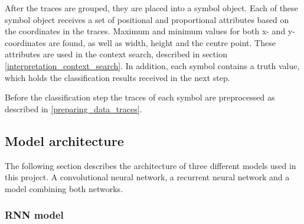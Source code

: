 After the traces are grouped, they are placed into a symbol object. Each of these symbol object receives a set of positional and proportional attributes based on the coordinates in the traces. Maximum and minimum values for both x- and y-coordinates are found, as well as width, height and the centre point. These attributes are used in the context search, described in section \ref{interpretation_context_search}. In addition, each symbol contains a truth value, which holds the classification results received in the next step.

Before the classification step the traces of each symbol are preprocessed as described in \ref{preparing_data_traces}. 

\subsection{Model architecture} 

The following section describes the architecture of three different models used in this project. A convolutional neural network, a recurrent neural network and a model combining both networks.

\subsubsection{RNN model}

